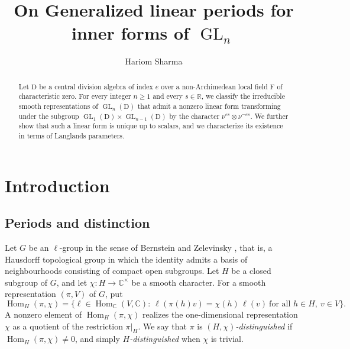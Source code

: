 \documentclass[11pt]{amsart}
\numberwithin{equation}{section}
\theoremstyle{plain}
\theoremstyle{definition}
\theoremstyle{remark}
\newcommand{\R}{\mathbb{R}}
\newcommand{\C}{\mathbb{C}}
\DeclareMathOperator{\GL}{GL}
\DeclareMathOperator{\Hom}{Hom}
\begin{document}
\title[On Generalized linear periods for inner forms of $\GL_n$]{On Generalized linear periods for inner forms of $\GL_n$}
\author{Hariom Sharma}
\address{Department of Mathematics, Indian Institute of Technology Bombay, Powai, Mumbai 400076, India}

\begin{abstract}
Let $\mathrm{D}$ be a central division algebra of index $e$ over a non-Archimedean local field $\mathrm{F}$ of characteristic zero. For every integer $n\ge 1$ and every $s\in\R$, we classify the irreducible smooth representations of $\GL_n(\mathrm{D})$ that admit a nonzero linear form transforming under the subgroup $\GL_1(\mathrm{D})\times\GL_{n-1}(\mathrm{D})$ by the character $\nu^{es}\otimes\nu^{-es}$. We further show that such a linear form is unique up to scalars, and we characterize its existence in terms of Langlands parameters.
\end{abstract}

\maketitle
\setcounter{tocdepth}{1}
\tableofcontents

\section{Introduction}\label{sec:intro}

\subsection{Periods and distinction}
Let $G$ be an $\ell$-group in the sense of Bernstein and Zelevinsky \cite[\S 1.1]{BZ76}, that is, a Hausdorff topological group in which the identity admits a basis of neighbourhoods consisting of compact open subgroups. Let $H$ be a closed subgroup of $G$, and let $\chi\colon H\to\C^\times$ be a smooth character. For a smooth representation $(\pi,V)$ of $G$, put
$$\Hom_H(\pi,\chi)=\{\ell\in\Hom_\C(V,\C):\ \ell(\pi(h)v)=\chi(h)\,\ell(v)\ \text{for all }h\in H,\ v\in V\}.
$$
A nonzero element of $\Hom_H(\pi,\chi)$ realizes the one-dimensional representation $\chi$ as a quotient of the restriction $\pi|_H$. We say that $\pi$ is \emph{$(H,\chi)$-distinguished} if $\Hom_H(\pi,\chi)\ne0$, and simply \emph{$H$-distinguished} when $\chi$ is trivial.
\end{document}
